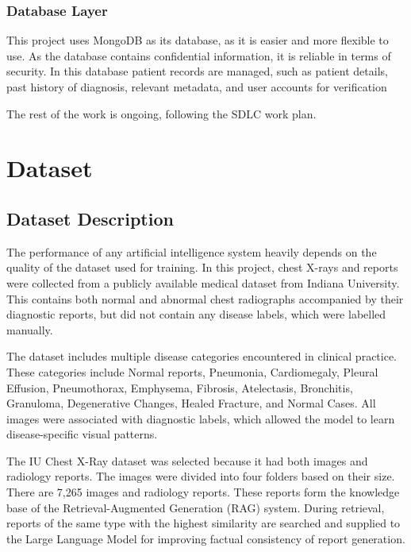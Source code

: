 \subsubsection*{Database Layer}

This project uses MongoDB as its database, as it is easier and more flexible to use. As the
database contains confidential information, it is reliable in terms of security. In this database
patient records are managed, such as patient details, past history of diagnosis, relevant
metadata, and user accounts for verification



The rest of the work is ongoing, following the SDLC work plan.

\section{Dataset}

\subsection{Dataset Description}

The performance of any artificial intelligence system heavily depends on the quality of the
dataset used for training. In this project, chest X-rays and reports were collected from a
publicly available medical dataset from Indiana University. This contains both normal and
abnormal chest radiographs accompanied by their diagnostic reports, but did not contain any
disease labels, which were labelled manually.

The dataset includes multiple disease categories encountered in clinical practice. These
categories include Normal reports, Pneumonia, Cardiomegaly, Pleural Effusion, Pneumothorax,
Emphysema, Fibrosis, Atelectasis, Bronchitis, Granuloma, Degenerative Changes, Healed
Fracture, and Normal Cases. All images were associated with diagnostic labels, which allowed
the model to learn disease-specific visual patterns.

The IU Chest X-Ray dataset was selected because it had both images and radiology reports.
The images were divided into four folders based on their size. There are 7,265 images and
radiology reports. These reports form the knowledge base of the Retrieval-Augmented
Generation (RAG) system. During retrieval, reports of the same type with the highest
similarity are searched and supplied to the Large Language Model for improving factual
consistency of report generation.

